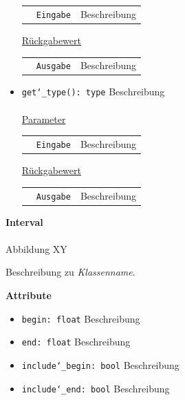 \documentclass{article}
\begin{document}
\begin{itemize}
\begin{tabular}{lll}
 & \texttt{Eingabe} & Beschreibung \\
\end{tabular}

\underline{{Rückgabewert}}

\begin{tabular}{lll}
 & \texttt{Ausgabe} & Beschreibung \\
\end{tabular}

\item \texttt{get\char`_type(): type} \newline Beschreibung
\\\\
\underline{{Parameter}}

\begin{tabular}{lll}
 & \texttt{Eingabe} & Beschreibung \\
\end{tabular}

\underline{{Rückgabewert}}

\begin{tabular}{lll}
 & \texttt{Ausgabe} & Beschreibung \\
\end{tabular}
\end{itemize}


\newpage
\textbf{\large{Interval}}\\\\
Abbildung XY

Beschreibung zu \textit{Klassenname}.
\newline \newline

\textbf{{Attribute}}
\begin{itemize}
\item \texttt{begin: float} \newline Beschreibung
\item \texttt{end: float} \newline Beschreibung
\item \texttt{include\char`_begin: bool} \newline Beschreibung
\item \texttt{include\char`_end: bool} \newline Beschreibung
\\\\
\end{itemize}
\end{document}
